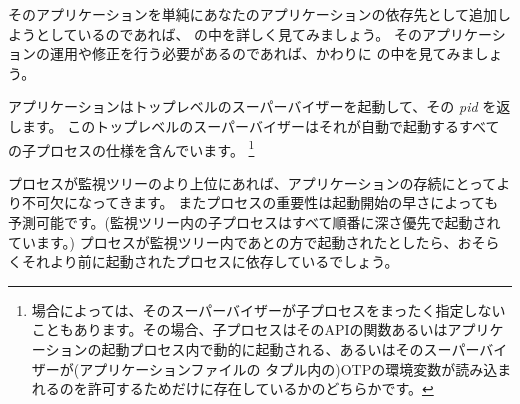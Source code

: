 そのアプリケーションを単純にあなたのアプリケーションの依存先として追加しようとしているのであれば、 の中を詳しく見てみましょう。
そのアプリケーションの運用や修正を行う必要があるのであれば、かわりに  の中を見てみましょう。

アプリケーションはトップレベルのスーパーバイザーを起動して、その \emph{pid} を返します。
このトップレベルのスーパーバイザーはそれが自動で起動するすべての子プロセスの仕様を含んでいます。 \footnote{場合によっては、そのスーパーバイザーが子プロセスをまったく指定しないこともあります。その場合、子プロセスはそのAPIの関数あるいはアプリケーションの起動プロセス内で動的に起動される、あるいはそのスーパーバイザーが(アプリケーションファイルの  タプル内の)OTPの環境変数が読み込まれるのを許可するためだけに存在しているかのどちらかです。}

プロセスが監視ツリーのより上位にあれば、アプリケーションの存続にとってより不可欠になってきます。
またプロセスの重要性は起動開始の早さによっても予測可能です。(監視ツリー内の子プロセスはすべて順番に深さ優先で起動されています。)
プロセスが監視ツリー内であとの方で起動されたとしたら、おそらくそれより前に起動されたプロセスに依存しているでしょう。

